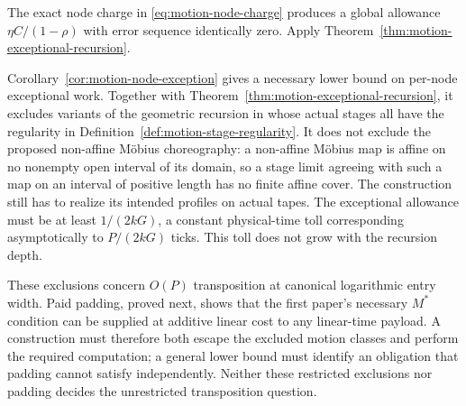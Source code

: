 \begin{proofoutline}
The exact node charge in \eqref{eq:motion-node-charge} produces a global
allowance $\eta C/(1-\rho)$ with error sequence identically zero.  Apply
Theorem~\ref{thm:motion-exceptional-recursion}.
\end{proofoutline}

Corollary~\ref{cor:motion-node-exception} gives a necessary lower bound on
per-node exceptional work.  Together with
Theorem~\ref{thm:motion-exceptional-recursion}, it excludes variants of the
geometric recursion in \cite[Section~13]{FirstPaper2026} whose actual stages
all have the regularity in Definition~\ref{def:motion-stage-regularity}.
It does not exclude the proposed non-affine M\"obius choreography: a
non-affine M\"obius map is affine on no nonempty open interval of its domain,
so a stage limit agreeing with such a map on an interval of positive length
has no finite affine cover.
The construction still has to realize its intended profiles on actual tapes.
The exceptional allowance must be at least $1/(2kG)$, a constant physical-time
toll corresponding asymptotically to $P/(2kG)$ ticks.  This toll does not grow
with the recursion depth.

These exclusions concern $O(P)$ transposition at canonical logarithmic
entry width.  Paid padding, proved next, shows that the first paper's
necessary $M^*$ condition can be supplied at additive linear cost to any
linear-time payload.  A construction must therefore both escape the excluded
motion classes and perform the required computation; a general lower bound
must identify an obligation that padding cannot satisfy independently.
Neither these restricted exclusions nor padding decides the unrestricted
transposition question.
